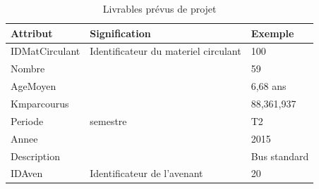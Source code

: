 \documentclass[a4paper]{report}
\begin{document}
\begin{doublespace}
	\begin{table}[H]
		\begin{center}
			\begin{tabularx}{17.5cm}{|X|X|X|}
				\hline
				\textbf{Attribut} & \textbf{Signification}               &
				\textbf{Exemple}                                                        \\
				\hline
				IDMatCirculant    & Identificateur du materiel circulant &
				100                                                                     \\
				\hline
				Nombre            &                                      & 59           \\
				\hline
				AgeMoyen          &                                      & 6,68 ans     \\
				\hline
				Kmparcourus       &                                      & 88,361,937   \\
				\hline
				Periode           & semestre                             & T2           \\
				\hline
				Annee             &                                      & 2015         \\
				\hline
				Description       &                                      & Bus standard \\
				\hline
				IDAven            & Identificateur de l'avenant          & 20           \\
				\hline
			\end{tabularx}
			\caption{Livrables prévus de projet}
		\end{center}
	\end{table}
	

\end{doublespace}
\end{document}
